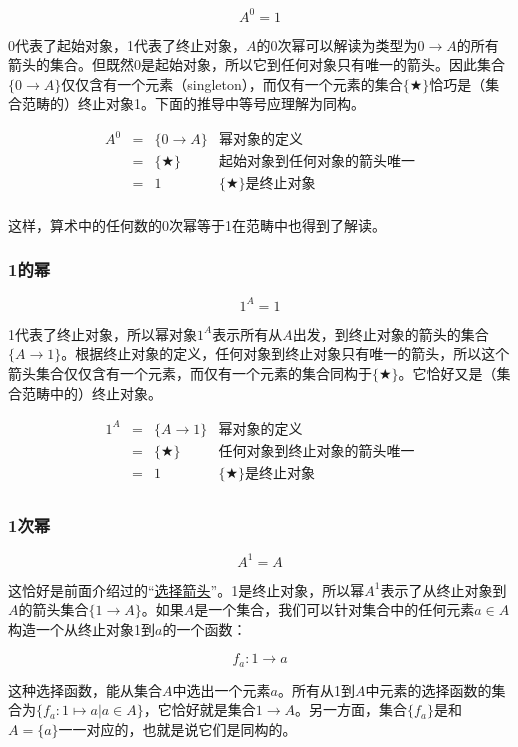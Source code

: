 \documentclass{article}
\begin{document}
\[
  A^0 = 1
\]

0代表了起始对象，1代表了终止对象，$A$的0次幂可以解读为类型为$0 \to A$的所有箭头的集合。但既然0是起始对象，所以它到任何对象只有唯一的箭头。因此集合$\{ 0 \to A \}$仅仅含有一个元素（singleton），而仅有一个元素的集合$\{ \bigstar \}$恰巧是（集合范畴的）终止对象1。下面的推导中等号应理解为同构。

\[
\begin{array}{rcll}
A^0 & = & \{ 0 \to A \} & \text{幂对象的定义} \\
    & = & \{ \bigstar \} & \text{起始对象到任何对象的箭头唯一} \\
    & = & 1 & \{ \bigstar \}\text{是终止对象} \\
\end{array}
\]

这样，算术中的任何数的0次幂等于1在范畴中也得到了解读。

\subsubsection{1的幂}

\[
  1^A = 1
\]

1代表了终止对象，所以幂对象$1^A$表示所有从$A$出发，到终止对象的箭头的集合$\{ A \to 1 \}$。根据终止对象的定义，任何对象到终止对象只有唯一的箭头，所以这个箭头集合仅仅含有一个元素，而仅有一个元素的集合同构于$\{ \bigstar \}$。它恰好又是（集合范畴中的）终止对象。

\[
\begin{array}{rcll}
1^A & = & \{ A \to 1 \} & \text{幂对象的定义} \\
    & = & \{ \bigstar \} & \text{任何对象到终止对象的箭头唯一} \\
    & = & 1 & \{ \bigstar \}\text{是终止对象} \\
\end{array}
\]

\subsubsection{1次幂}

\[
  A^1 = A
\]

这恰好是前面介绍过的“\hyperref[sec:selection-arrow]{选择箭头}”。1是终止对象，所以幂$A^1$表示了从终止对象到$A$的箭头集合$\{ 1 \to A\}$。如果$A$是一个集合，我们可以针对集合中的任何元素$a \in A$构造一个从终止对象1到$a$的一个函数：

\[
  f_a : 1 \to a
\]

这种选择函数，能从集合$A$中选出一个元素$a$。所有从1到$A$中元素的选择函数的集合为$\{f_a : 1 \mapsto a | a \in A\}$，它恰好就是集合$1 \to A$。另一方面，集合$\{ f_a \}$是和$A = \{a\}$一一对应的，也就是说它们是同构的。
\end{document}
